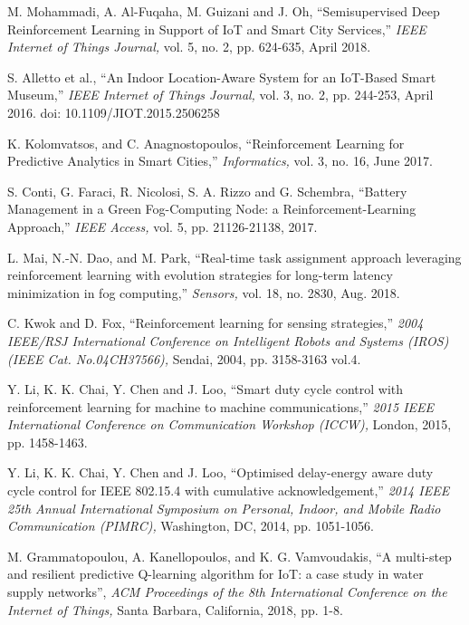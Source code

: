 \documentclass[journal]{IEEEtran}
\begin{document}
\begin{thebibliography}{1}
M. Mohammadi, A. Al-Fuqaha, M. Guizani and J. Oh, ``Semisupervised Deep Reinforcement Learning in Support of IoT and Smart City Services,'' \emph{IEEE Internet of Things Journal,} vol. 5, no. 2, pp. 624-635, April 2018.

S. Alletto et al., ``An Indoor Location-Aware System for an IoT-Based Smart Museum,'' \emph{IEEE Internet of Things Journal,} vol. 3, no. 2, pp. 244-253, April 2016.
doi: 10.1109/JIOT.2015.2506258

K. Kolomvatsos, and C. Anagnostopoulos, ``Reinforcement Learning for Predictive Analytics in
Smart Cities,'' \emph{Informatics,} vol. 3, no. 16, June 2017.

S. Conti, G. Faraci, R. Nicolosi, S. A. Rizzo and G. Schembra, ``Battery Management in a Green Fog-Computing Node: a Reinforcement-Learning Approach,'' \emph{IEEE Access,} vol. 5, pp. 21126-21138, 2017.

L. Mai, N.-N. Dao, and M. Park, ``Real-time task assignment approach leveraging reinforcement learning with evolution strategies for long-term latency minimization in fog computing,'' \emph{Sensors,} vol. 18, no. 2830, Aug. 2018.

C. Kwok and D. Fox, ``Reinforcement learning for sensing strategies,'' \emph{2004 IEEE/RSJ International Conference on Intelligent Robots and Systems (IROS) (IEEE Cat. No.04CH37566),} Sendai, 2004, pp. 3158-3163 vol.4.

Y. Li, K. K. Chai, Y. Chen and J. Loo, ``Smart duty cycle control with reinforcement learning for machine to machine communications,'' \emph{2015 IEEE International Conference on Communication Workshop (ICCW),} London, 2015, pp. 1458-1463.

Y. Li, K. K. Chai, Y. Chen and J. Loo, ``Optimised delay-energy aware duty cycle control for IEEE 802.15.4 with cumulative acknowledgement,'' \emph{2014 IEEE 25th Annual International Symposium on Personal, Indoor, and Mobile Radio Communication (PIMRC),} Washington, DC, 2014, pp. 1051-1056.

M. Grammatopoulou, A. Kanellopoulos, and K. G. Vamvoudakis, ``A multi-step and resilient predictive Q-learning algorithm for IoT: a case study in water supply networks'', \emph{ACM Proceedings of the 8th International Conference on the Internet of Things,} Santa Barbara, California, 2018, pp. 1-8.


\end{thebibliography}
\end{document}
